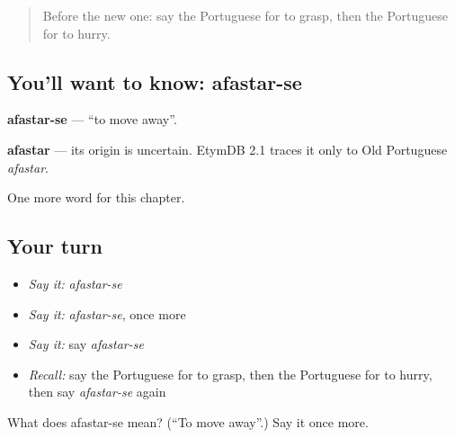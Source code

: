 \label{lesson:PT-C177-afastar-se}



\begin{quote}
Before the new one: say the Portuguese for to grasp, then the Portuguese for to hurry.
\end{quote}

\subsection*{You'll want to know: afastar-se}
\textbf{afastar-se} — \textquotedblleft{}to move away\textquotedblright{}.

\begin{cousinweb}
\textbf{afastar} — its origin is uncertain. EtymDB 2.1 traces it only to Old Portuguese \emph{afastar}.
\end{cousinweb}

\begin{grammarlens}[title={What you've built}]
One more word for this chapter.
\end{grammarlens}

\subsection*{Your turn}
\begin{itemize}
\raggedright
  \item \emph{Say it:} \emph{afastar-se}
  \item \emph{Say it:} \emph{afastar-se}, once more
  \item \emph{Say it:} say \emph{afastar-se}
  \item \emph{Recall:} say the Portuguese for to grasp, then the Portuguese for to hurry, then say \emph{afastar-se} again
\end{itemize}

\begin{tcolorbox}[breakable,colback=teal!4,colframe=teal!35!black,title={Before you move on}]
What does afastar-se mean? (\textquotedblleft{}To move away\textquotedblright{}.) Say it once more.
\end{tcolorbox}
